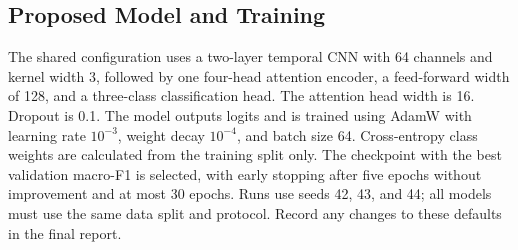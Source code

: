 \subsection{Proposed Model and Training}
The shared configuration uses a two-layer temporal CNN with 64 channels and kernel width 3, followed by one four-head attention encoder, a feed-forward width of 128, and a three-class classification head. The attention head width is 16. Dropout is 0.1. The model outputs logits and is trained using AdamW with learning rate $10^{-3}$, weight decay $10^{-4}$, and batch size 64. Cross-entropy class weights are calculated from the training split only. The checkpoint with the best validation macro-F1 is selected, with early stopping after five epochs without improvement and at most 30 epochs. Runs use seeds 42, 43, and 44; all models must use the same data split and protocol. Record any changes to these defaults in the final report.
